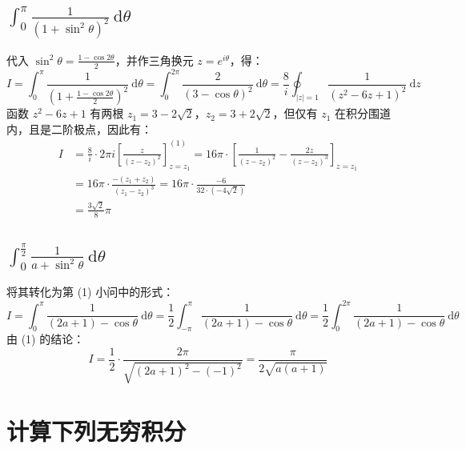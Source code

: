\documentclass[UTF8]{report}
\theoremstyle{MyLineTheoremStyle} %
\theoremstyle{MyBlockTheoremStyle} %
\theoremstyle{MySubsubsectionStyle} %
\begin{document}
\subsection{$\displaystyle \int_{0}^{\pi}\frac{1}{\left(1 + \sin^2 \theta \right)^2} \ \mathrm{d}\theta$}
代入 $\sin^2 \theta = \frac{1 - \cos 2\theta}{2}$，并作三角换元 $z = e^{i\theta}$，得：
\begin{equation}
I = \int_{0}^{\pi} \frac{1}{\left(1 + \frac{1 - \cos 2\theta}{2}\right)^2} \ \mathrm{d} \theta = \int_{0}^{2\pi} \frac{2}{\left(3 - \cos \theta\right)^2} \ \mathrm{d}\theta
= \frac{8}{i} \oint_{|z| = 1} \frac{1}{\left(z^2 - 6z + 1\right)^2} \ \mathrm{d}z
\end{equation}
函数 $z^2 - 6z + 1$ 有两根 $z_1 = 3 - 2 \sqrt{2}$，$z_2 =  3 + 2 \sqrt{2}$，但仅有 $z_1$ 在积分围道内，且是二阶极点，因此有：
\begin{align}
    I &= \frac{8}{i}\cdot 2\pi i \left[\frac{z}{(z - z_2)^2}\right]^{(1)}_{z = z_1}
    = 16 \pi \cdot \left[\frac{1}{(z - z_2)^2} - \frac{2z}{(z - z_2)^3}\right]_{z = z_1}\\
    &= 16\pi \cdot \frac{-(z_1 + z_2)}{(z_1 - z_2)^3}
    = 16\pi \cdot \frac{-6}{32\cdot (-4\sqrt{2})}\\
    & \boxed{= \frac{3\sqrt{2}}{8}\pi}
\end{align}

\subsection{$\displaystyle \int_{0}^{\frac{\pi}{2}} \frac{1}{a + \sin^2 \theta} \ \mathrm{d}\theta$}
将其转化为第 (1) 小问中的形式：
\begin{equation}
I = \int_{0}^{\pi} \frac{1}{(2a+1) - \cos \theta} \ \mathrm{d}\theta
= \frac{1}{2}\int_{-\pi}^{\pi} \frac{1}{(2a+1) - \cos \theta} \ \mathrm{d}\theta
= \frac{1}{2}\int_{0}^{2\pi} \frac{1}{(2a+1) - \cos \theta} \ \mathrm{d}\theta
\end{equation}
由 (1) 的结论：
\begin{equation}
\boxed{
    I = \frac{1}{2}\cdot \frac{2\pi}{\sqrt{(2a+1)^2 - (-1)^2}} = \frac{\pi}{2\sqrt{a(a+1)}}
}
\end{equation}

\section{计算下列无穷积分}
\end{document}

